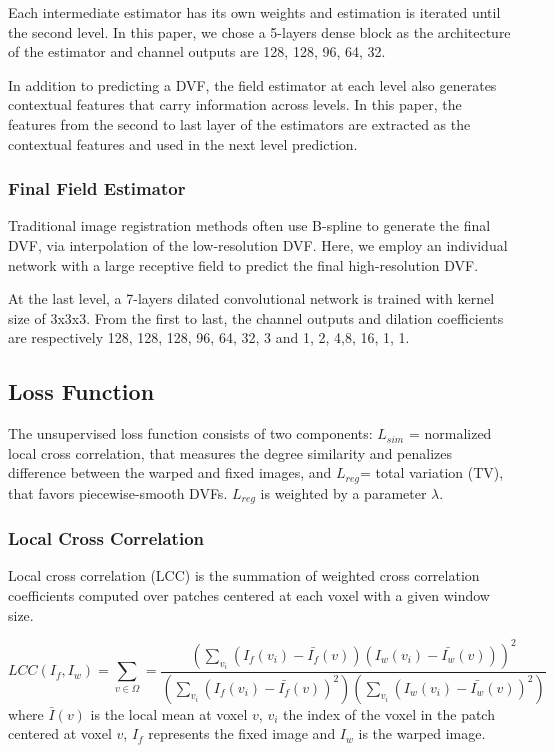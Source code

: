 \documentclass[runningheads]{llncs}
\begin{document}
Each intermediate estimator has its own weights and estimation is iterated until the second level. In this paper, we chose a 5-layers dense block as the architecture of the estimator and channel outputs are 128, 128, 96, 64, 32.  

In addition to predicting a DVF, the field estimator at each level also generates contextual features that carry information across levels. In this paper, the features from  the second to last layer of the estimators are extracted as the contextual features and  used in the next level prediction.

\subsubsection{Final Field Estimator}
Traditional image registration methods often use B-spline to generate the final DVF, via interpolation of the low-resolution DVF. 
Here, we employ an individual network with a large receptive field to predict the final high-resolution DVF. 

At the last level, a 7-layers dilated convolutional network \cite{chenDeepLabSemanticImage2017} is trained with kernel size of 3x3x3. From the first to last, the channel outputs and dilation coefficients are respectively 128, 128, 128, 96, 64, 32, 3 and 1, 2, 4,8, 16, 1, 1. 

\subsection{Loss Function}
The unsupervised loss function consists  of two components: $L_{sim}$ = normalized local cross correlation, that measures the degree similarity and penalizes difference between the warped and fixed images, and $L_{reg}$= total variation (TV), that favors piecewise-smooth DVFs. $L_{reg}$ is weighted by a parameter $\lambda$. 


\subsubsection{Local Cross Correlation}
Local cross correlation (LCC) is the summation of weighted cross correlation coefficients computed over patches centered at each voxel with a given window size.

\begin{equation}
LCC(I_f, I_w)= \sum_{v \in \Omega} = \frac {(\sum_{v_i} (I_f(v_i) - \bar{I_f}(v)) (I_w (v_i) - \bar{I_w} (v)) )^2} {(\sum_{v_i} (I_f(v_i)-\bar{I_f}(v))^2) (\sum_{v_i} (I_w(v_i) - \bar{I_w}(v))^2)}
\end{equation}
where $\bar{I}(v)$ is the local mean at voxel $v$, $v_i$ the index of the voxel in the patch centered at voxel $v$, $I_f$ represents the fixed image and $I_w$ is the warped image.
\end{document}

